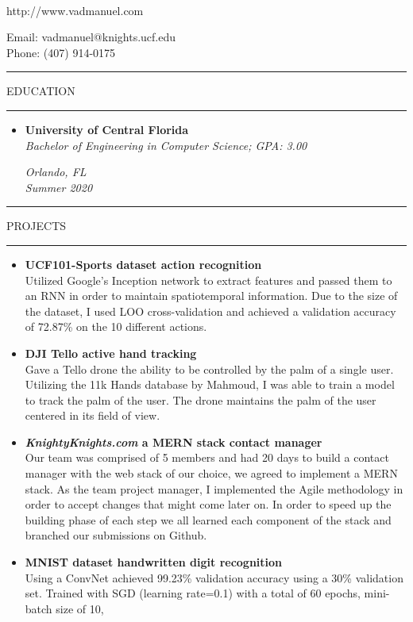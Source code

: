 \documentclass{article}
\makeatletter
\newcommand{\name}{Manuel Vasquez}
\newcommand{\website}{http://www.vadmanuel.com}
\newcommand{\email}{vadmanuel@knights.ucf.edu}
\newcommand{\phone}{(407) 914-0175}
\newcommand{\makeminipage}[4]{
    \begin{minipage}[c]{9cm}
        \flushleft #1 \\ #2
    \end{minipage} \hfill
    \begin{minipage}[c]{9cm}
        \flushright #3 \\ #4
    \end{minipage}
}
\newcommand{\makesection}[1]{\hrule\vskip1mm\uppercase{#1}\vskip1mm\hrule}
\makeatother
\begin{document}
    \setlength{\parindent}{0cm}

    \makeminipage
        {{\large\textbf{\name}}}
        {\website}
        {Email: \email}
        {Phone: \phone}
    \bigbreak

    \makesection{Education}
    \begin{itemize}[leftmargin=.35cm]
        \item \makeminipage
            {\textbf{University of Central Florida}}
            {\textit{Bachelor of Engineering in Computer Science; GPA: 3.00}}
            {\textit{Orlando, FL}}
            {\textit{Summer 2020}}
    \end{itemize}

    \makesection{Projects}
    \begin{itemize}[leftmargin=.35cm]
        \item \textbf{UCF101-Sports dataset action recognition} \\
        Utilized Google's Inception network to extract features and passed them to an RNN
        in order to maintain spatiotemporal information. Due to the size of the dataset, I
        used LOO cross-validation and achieved a validation accuracy of 72.87\% on the 10
        different actions.
        \item \textbf{DJI Tello active hand tracking} \\
        Gave a Tello drone the ability to be controlled by the palm of a single user. Utilizing
        the 11k Hands database by Mahmoud, I was able to train a model to track the palm of the
        user. The drone maintains the palm of the user centered in its field of view.
        \item \textbf{\textit{KnightyKnights.com} a MERN stack contact manager} \\
        Our team was comprised of 5 members and had 20 days to build a contact manager with the
        web stack of our choice, we agreed to implement a MERN stack. As the team project manager,
        I implemented the Agile methodology in order to accept changes that might come later on.
        In order to speed up the building phase of each step we all learned each component of
        the stack and branched our submissions on Github.
        \item \textbf{MNIST dataset handwritten digit recognition} \\
        Using a ConvNet achieved 99.23\% validation accuracy using a 30\% validation set.
        Trained with SGD (learning rate=0.1) with a total of 60 epochs, mini-batch size of 10,

\end{itemize}
\end{document}
